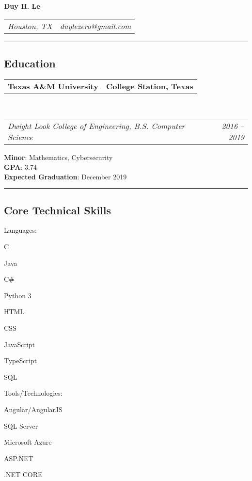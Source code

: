 \documentclass[10pt,letterpaper]{article}
\makeatletter
\newenvironment{indentsection}[1]%
{\begin{list}{}%
	{\setlength{\leftmargin}{#1}}%
	\item[]%
}
{\end{list}}
\newcommand{\headerrow}[2]
{\begin{tabular*}{\linewidth}{l@{\extracolsep{\fill}}r}
	#1 &
	#2 \\
\end{tabular*}}
\newcommand{\CPP}
{C\nolinebreak[4]\hspace{-.05em}\raisebox{.22ex}{\footnotesize\bf ++}}
\makeatother
\begin{document}
\begin{center}
{\LARGE \textbf{Duy H. Le}}
\end{center}
	\headerrow
		{\emph{Houston, TX}}
		{\emph{duylezero@gmail.com}}
\hrule
\vspace{-0.8em}
\subsection*{Education}

	\headerrow
		{\textbf{Texas A\&M University}}
		{\textbf{College Station, Texas}}
	\\
	\headerrow
		{\emph{Dwight Look College of Engineering, B.S. Computer Science}}
		{\emph{2016 -- 2019}}
	\begin{indentsection}{\parindent}
	\vspace{-0.4em}
		 \textbf{Minor}: Mathematics, Cybersecurity \\
		 \textbf{GPA}: 3.74 \\
		\textbf{Expected Graduation}: December 2019
	\end{indentsection}

\hrule
\vspace{-0.8em}
\subsection*{Core Technical Skills}
\vspace{-0.4em}
\begin{indentsection}{\parindent}
\begin{description*}
	\item[Languages:]
	\begin{inparaitem}[\ * \ ]
 		\CPP \ 
		\item Java
		\item C\#
		\item Python 3
		\item HTML
		\item CSS
		\item JavaScript
		\item TypeScript
		\item SQL
	\end{inparaitem}
	\item[Tools/Technologies:]
		\begin{inparaitem}[\ * \ ]
 		 Angular/AngularJS \
		\item SQL Server
		\item Microsoft Azure
		\item ASP.NET
		\item .NET CORE
	\end{inparaitem}
\end{description*}
\end{indentsection}
\end{document}
